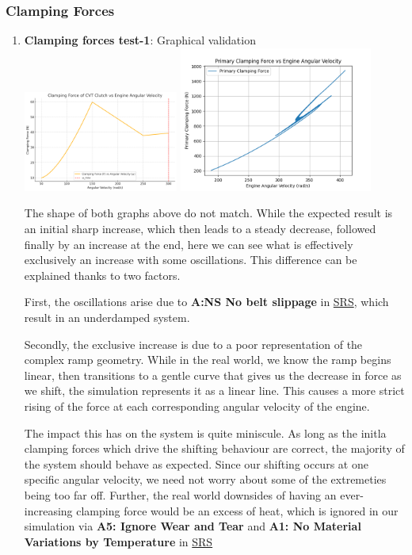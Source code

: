 \documentclass[12pt, titlepage]{article}
\begin{document}
\subsubsection{Clamping Forces}
\begin{enumerate}
\item{\textbf{Clamping forces test-1}: Graphical validation}\\

\includegraphics[width=0.4\textwidth]{theoretical-figures/clamp_force.png}
\includegraphics[width=0.5\textwidth]{simulation-figures/primary_clamping.png}

The shape of both graphs above do not match. While the expected result is an initial sharp increase, which then leads to a steady decrease, followed finally by an increase at the end, here we can see what is effectively exclusively an increase with some oscillations. This difference can be explained thanks to two factors.

First, the oscillations arise due to \textbf{A:NS No belt slippage} in \href{https://github.com/gr812b/CVT-Simulator/blob/develop/docs/SRS/SRS.pdf}{SRS}, which result in an underdamped system. 

Secondly, the exclusive increase is due to a poor representation of the complex ramp geometry. While in the real world, we know the ramp begins linear, then transitions to a gentle curve that gives us the decrease in force as we shift, the simulation represents it as a linear line. This causes a more strict rising of the force at each corresponding angular velocity of the engine.

The impact this has on the system is quite miniscule. As long as the initla clamping forces which drive the shifting behaviour are correct, the majority of the system should behave as expected. Since our shifting occurs at one specific angular velocity, we need not worry about some of the extremeties being too far off. Further, the real world downsides of having an ever-increasing clamping force would be an excess of heat, which is ignored in our simulation via \textbf{A5: Ignore Wear and Tear} and \textbf{A1: No Material Variations by Temperature} in \href{https://github.com/gr812b/CVT-Simulator/blob/develop/docs/SRS/SRS.pdf}{SRS}

\end{enumerate}
\end{document}
